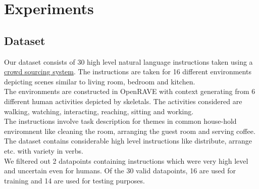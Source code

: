 \section{Experiments}
\subsection{Dataset}
Our dataset consists of 30 high level natural language instructions taken using a \href{http://52.25.65.189:9000/#/getFeedback}{crowd sourcing system}. The instructions are taken for 16 different environments depicting scenes similar to living room, bedroom and kitchen. \\
The environments are constructed in OpenRAVE with context generating from 6 different human activities depicted by skeletals. The activities considered are walking, watching, interacting, reaching, sitting and working. \\
The instructions involve task description for themes in common house-hold enviromnent like cleaning the room, arranging the guest room and serving coffee. The dataset contains considerable high level instructions like distribute, arrange etc. with variety in verbs.\\
We filtered out 2 datapoints containing instructions which were very high level and uncertain even for  humans. Of the 30 valid datapoints, 16 are used for training and 14 are used for testing purposes.  
